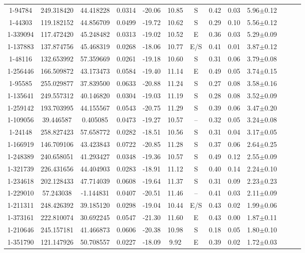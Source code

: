 \begin{table*}
\begin{tabular}{ccccccccccccc}
1-94784 & 249.318420 & 44.418228 & 0.0314 & -20.06 & 10.85 & S & 0.42 & 0.03 & 5.96$\pm$0.12\\
1-44303 & 119.182152 & 44.856709 & 0.0499 & -19.72 & 10.62 & S & 0.29 & 0.10 & 5.56$\pm$0.12\\
1-339094 & 117.472420 & 45.248482 & 0.0313 & -19.02 & 10.52 & E & 0.36 & 0.03 & 5.29$\pm$0.09\\
1-137883 & 137.874756 & 45.468319 & 0.0268 & -18.06 & 10.77 & E/S & 0.41 & 0.01 & 3.87$\pm$0.12\\
1-48116 & 132.653992 & 57.359669 & 0.0261 & -19.18 & 10.60 & S & 0.31 & 0.06 & 3.79$\pm$0.08\\
1-256446 & 166.509872 & 43.173473 & 0.0584 & -19.40 & 11.14 & E & 0.49 & 0.05 & 3.74$\pm$0.15\\
1-95585 & 255.029877 & 37.839500 & 0.0633 & -20.88 & 11.24 & S & 0.27 & 0.08 & 3.58$\pm$0.16\\
1-135641 & 249.557312 & 40.146820 & 0.0304 & -19.03 & 11.19 & S & 0.28 & 0.08 & 3.52$\pm$0.09\\
1-259142 & 193.703995 & 44.155567 & 0.0543 & -20.75 & 11.29 & S & 0.39 & 0.06 & 3.47$\pm$0.20\\
1-109056 & 39.446587 & 0.405085 & 0.0473 & -19.27 & 10.57 & -- & 0.32 & 0.05 & 3.24$\pm$0.08\\
1-24148 & 258.827423 & 57.658772 & 0.0282 & -18.51 & 10.56 & S & 0.31 & 0.04 & 3.17$\pm$0.05\\
1-166919 & 146.709106 & 43.423843 & 0.0722 & -20.85 & 11.28 & S & 0.37 & 0.06 & 2.64$\pm$0.25\\
1-248389 & 240.658051 & 41.293427 & 0.0348 & -19.36 & 10.57 & S & 0.49 & 0.12 & 2.55$\pm$0.09\\
1-321739 & 226.431656 & 44.404903 & 0.0283 & -18.91 & 11.12 & S & 0.40 & 0.14 & 2.24$\pm$0.10\\
1-234618 & 202.128433 & 47.714039 & 0.0608 & -19.64 & 11.37 & S & 0.31 & 0.09 & 2.23$\pm$0.23\\
1-229010 & 57.243038 & -1.144831 & 0.0407 & -20.51 & 11.46 & -- & 0.41 & 0.03 & 2.11$\pm$0.09\\
1-211311 & 248.426392 & 39.185120 & 0.0298 & -19.04 & 10.44 & E/S & 0.43 & 0.02 & 1.99$\pm$0.06\\
1-373161 & 222.810074 & 30.692245 & 0.0547 & -21.30 & 11.60 & E & 0.43 & 0.00 & 1.87$\pm$0.11\\
1-210646 & 245.157181 & 41.466873 & 0.0606 & -20.38 & 10.98 & S & 0.18 & 0.05 & 1.80$\pm$0.10\\
1-351790 & 121.147926 & 50.708557 & 0.0227 & -18.09 & 9.92 & E & 0.39 & 0.02 & 1.72$\pm$0.03\\

\end{tabular}
\end{table*}
